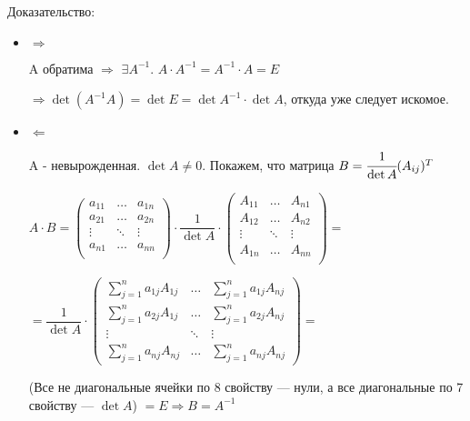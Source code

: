 Доказательство:
\begin{itemize}
    \item \(\Rightarrow\)

          A обратима \(\Rightarrow\) \(\exists  A^{-1}\). \( A \cdot    A^{-1}  =  A^{-1} \cdot A = E \)

          \(\Rightarrow \det( A^{-1} A) =\det E = \det A^{-1} \cdot \det A \), откуда уже следует искомое.

    \item \(\Leftarrow\)

          A - невырожденная. \(\det A \neq 0 \). Покажем, что матрица  \(B=\cfrac{1}{\det A} (A_{ij})^T\)



          \(A \cdot B = \begin{pmatrix}
              a_{11} & \ldots & a_{1n} \\
              a_{21} & \ldots & a_{2n} \\
              \vdots & \ddots & \vdots \\
              a_{n1} & \ldots & a_{nn} \\
          \end{pmatrix} \cdot
          \dfrac{1}{\det A} \cdot \begin{pmatrix}
              A_{11} & \ldots & A_{n1} \\
              A_{12} & \ldots & A_{n2} \\
              \vdots & \ddots & \vdots \\
              A_{1n} & \ldots & A_{nn} \\
          \end{pmatrix} = \)

          \(= \dfrac{1}{\det A} \cdot
          \begin{pmatrix}
              \sum\limits_{j = 1}^{n} a_{1j} A_{1j} & \ldots & \sum\limits_{j = 1}^{n} a_{1j} A_{nj} \\
              \sum\limits_{j = 1}^{n} a_{2j} A_{1j} & \ldots & \sum\limits_{j = 1}^{n} a_{2j} A_{nj} \\
              \vdots                                & \ddots & \vdots                                \\
              \sum\limits_{j = 1}^{n} a_{nj} A_{nj} & \ldots & \sum\limits_{j = 1}^{n} a_{nj} A_{nj}
          \end{pmatrix} =\)

          (Все не диагональные ячейки по 8 свойству --- нули, а все диагональные по 7 свойству --- \(\det A\)) \(= E \Rightarrow B = A^{-1}\)
\end{itemize}

